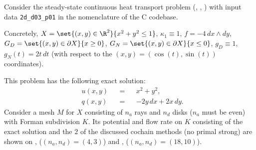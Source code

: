 \begin{example}
  \label{cmc/diffusion/continuous/steady_state/examples/2d_d03_p01-example}
  Consider the steady-state continuous heat transport problem
  (,
   ,
   )
  with input data \verb|2d_d03_p01| in the nomenclature of the C codebase.

  Concretely,
    $X = \set{(x, y) \in \R^2}{x^2 + y^2 \leq 1}$,
    $\kappa_1 \equiv 1$,
    $f = - 4 \, d x \wedge d y$,
    $G_D = \set{(x, y) \in \partial X}{x \geq 0}$,
    $G_N = \set{(x, y) \in \partial X}{x \leq 0}$,
    $g_D \equiv 1$,
    $g_N(t) = 2 t \, d t$
    (with respect to the $(x, y) = (\cos(t), \sin(t))$ coordinates).

  This problem has the following exact solution:
  \begin{subequations}
    \begin{alignat}{3}
      & u(x, y) && = && x^2 + y^2, \\
      & q(x, y) && = && -2 y \, d x + 2 x \, d y.
    \end{alignat}
  \end{subequations}
  Consider a mesh $M$ for $X$ consisting of $n_a$ rays and $n_d$ disks
  ($n_a$ must be even) with Forman subdivision $K$.
  Its potential and flow rate on $K$ consisting of the exact solution and the
  $2$ of the discussed cochain methods (no primal strong) are shown on
  ,
  ($(n_a, n_d) = (4, 3)$)
  and
  ,
  ($(n_a, n_d) = (18, 10)$).
\end{example}
